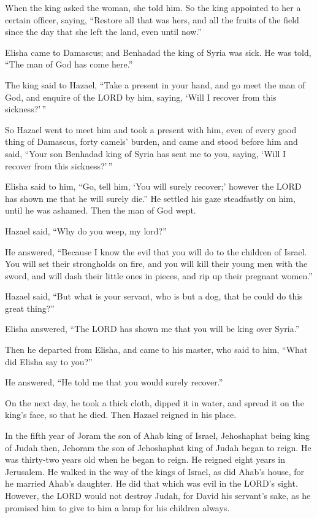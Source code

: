  When the king asked the woman, she told him. So the king
appointed to her a certain officer, saying, ``Restore all that was hers,
and all the fruits of the field since the day that she left the land,
even until now.''

 Elisha came to Damascus; and Benhadad the king of Syria
was sick. He was told, ``The man of God has come here.''

 The king said to Hazael, ``Take a present in your hand,
and go meet the man of God, and enquire of the LORD by him, saying,
`Will I recover from this sickness?'\,''

 So Hazael went to meet him and took a present with him,
even of every good thing of Damascus, forty camels' burden, and came and
stood before him and said, ``Your son Benhadad king of Syria has sent me
to you, saying, `Will I recover from this sickness?'\,''

 Elisha said to him, ``Go, tell him, `You will surely
recover;' however the LORD has shown me that he will surely die.''
 He settled his gaze steadfastly on him, until he was
ashamed. Then the man of God wept.

 Hazael said, ``Why do you weep, my lord?''

He answered, ``Because I know the evil that you will do to the children
of Israel. You will set their strongholds on fire, and you will kill
their young men with the sword, and will dash their little ones in
pieces, and rip up their pregnant women.''

 Hazael said, ``But what is your servant, who is but a
dog, that he could do this great thing?''

Elisha answered, ``The LORD has shown me that you will be king over
Syria.''

 Then he departed from Elisha, and came to his master,
who said to him, ``What did Elisha say to you?''

He answered, ``He told me that you would surely recover.''

 On the next day, he took a thick cloth, dipped it in
water, and spread it on the king's face, so that he died. Then Hazael
reigned in his place.

 In the fifth year of Joram the son of Ahab king of
Israel, Jehoshaphat being king of Judah then, Jehoram the son of
Jehoshaphat king of Judah began to reign.  He was
thirty-two years old when he began to reign. He reigned eight years in
Jerusalem.  He walked in the way of the kings of Israel,
as did Ahab's house, for he married Ahab's daughter. He did that which
was evil in the LORD's sight.  However, the LORD would
not destroy Judah, for David his servant's sake, as he promised him to
give to him a lamp for his children always.

